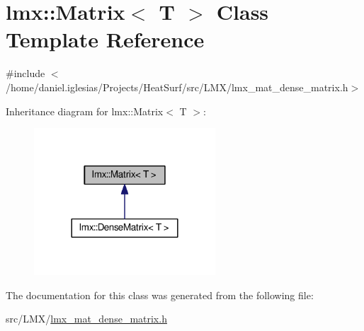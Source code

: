 \hypertarget{classlmx_1_1Matrix}{\section{lmx\-:\-:Matrix$<$ T $>$ Class Template Reference}
\label{classlmx_1_1Matrix}
}


{\ttfamily \#include $<$/home/daniel.\-iglesias/\-Projects/\-Heat\-Surf/src/\-L\-M\-X/lmx\-\_\-mat\-\_\-dense\-\_\-matrix.\-h$>$}



Inheritance diagram for lmx\-:\-:Matrix$<$ T $>$\-:
\nopagebreak
\begin{figure}[H]
\begin{center}
\leavevmode
\includegraphics[width=192pt]{classlmx_1_1Matrix__inherit__graph}
\end{center}
\end{figure}


The documentation for this class was generated from the following file\-:\begin{DoxyCompactItemize}
\item 
src/\-L\-M\-X/\hyperlink{lmx__mat__dense__matrix_8h}{lmx\-\_\-mat\-\_\-dense\-\_\-matrix.\-h}\end{DoxyCompactItemize}
